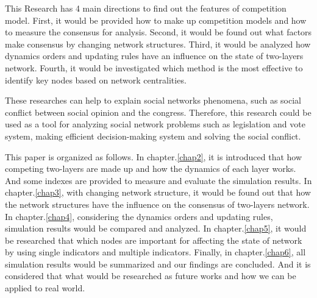 This Research has 4 main directions to find out the features of competition model. First, it would be provided how to make up competition models and how to measure the consensus for analysis. Second, it would be found out what factors make consensus by changing network structures. Third, it would be analyzed how dynamics orders and updating rules have an influence on the state of two-layers network. Fourth, it would be investigated which method is the most effective to identify key nodes based on network centralities.

These researches can help to explain social networks phenomena, such as social conflict between social opinion and the congress. Therefore, this research could be used as a tool for analyzing social network problems such as legislation and vote system, making efficient decision-making system and solving the social conflict.

This paper is organized as follows. In chapter.\ref{chap2}, it is introduced that how competing two-layers are made up and how the dynamics of each layer works. And some indexes are provided to measure and evaluate the simulation results. In chapter.\ref{chap3}, with changing network structure, it would be found out that how the network structures have the influence on the consensus of two-layers network. In chapter.\ref{chap4}, considering the dynamics orders and updating rules, simulation results would be compared and analyzed. In chapter.\ref{chap5}, it would be researched that which nodes are important for affecting the state of network by using single indicators and multiple indicators. Finally, in chapter.\ref{chap6}, all simulation results would be summarized and our findings are concluded. And it is considered that what would be researched as future works and how we can be applied to real world. 


